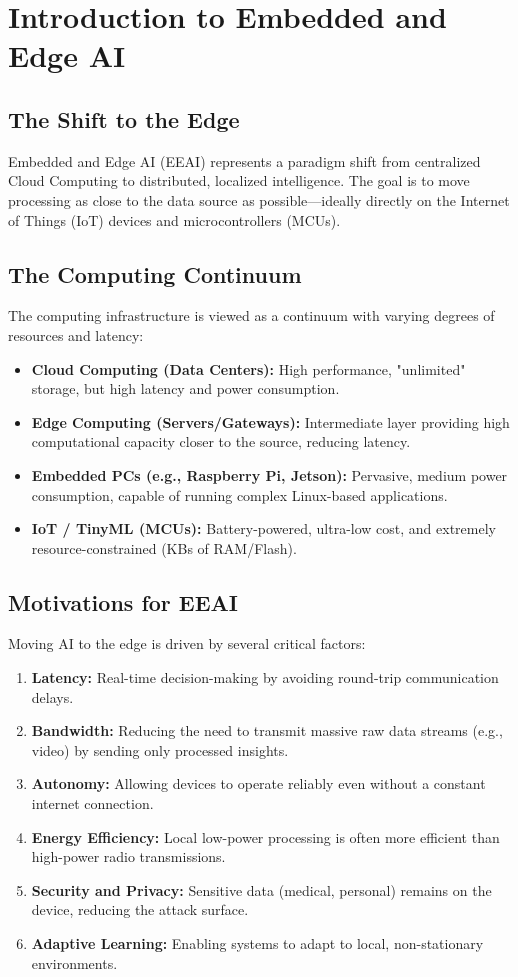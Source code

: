 \section{Introduction to Embedded and Edge AI}

\subsection{The Shift to the Edge}
Embedded and Edge AI (EEAI) represents a paradigm shift from centralized Cloud Computing to distributed, localized intelligence. The goal is to move processing as close to the data source as possible—ideally directly on the Internet of Things (IoT) devices and microcontrollers (MCUs).

\subsection{The Computing Continuum}
The computing infrastructure is viewed as a continuum with varying degrees of resources and latency:
\begin{itemize}
    \item \textbf{Cloud Computing (Data Centers):} High performance, "unlimited" storage, but high latency and power consumption.
    \item \textbf{Edge Computing (Servers/Gateways):} Intermediate layer providing high computational capacity closer to the source, reducing latency.
    \item \textbf{Embedded PCs (e.g., Raspberry Pi, Jetson):} Pervasive, medium power consumption, capable of running complex Linux-based applications.
    \item \textbf{IoT / TinyML (MCUs):} Battery-powered, ultra-low cost, and extremely resource-constrained (KBs of RAM/Flash).
\end{itemize}

\subsection{Motivations for EEAI}
Moving AI to the edge is driven by several critical factors:
\begin{enumerate}
    \item \textbf{Latency:} Real-time decision-making by avoiding round-trip communication delays.
    \item \textbf{Bandwidth:} Reducing the need to transmit massive raw data streams (e.g., video) by sending only processed insights.
    \item \textbf{Autonomy:} Allowing devices to operate reliably even without a constant internet connection.
    \item \textbf{Energy Efficiency:} Local low-power processing is often more efficient than high-power radio transmissions.
    \item \textbf{Security and Privacy:} Sensitive data (medical, personal) remains on the device, reducing the attack surface.
    \item \textbf{Adaptive Learning:} Enabling systems to adapt to local, non-stationary environments.
\end{enumerate}

